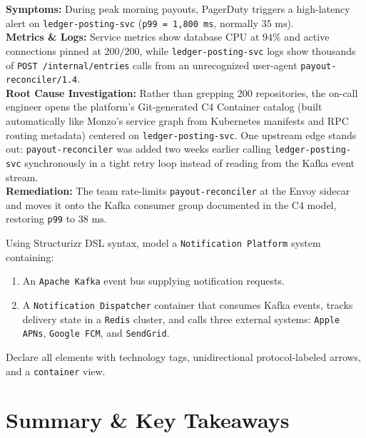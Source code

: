 \begin{realworldbox}
\textbf{Symptoms:} During peak morning payouts, PagerDuty triggers a high-latency alert on \texttt{ledger-posting-svc} (\texttt{p99 = 1,800 ms}, normally $35\text{ ms}$).\\
\textbf{Metrics \& Logs:} Service metrics show database CPU at $94\%$ and active connections pinned at $200/200$, while \texttt{ledger-posting-svc} logs show thousands of \texttt{POST /internal/entries} calls from an unrecognized user-agent \texttt{payout-reconciler/1.4}.\\
\textbf{Root Cause Investigation:} Rather than grepping 200 repositories, the on-call engineer opens the platform's Git-generated C4 Container catalog (built automatically like Monzo's service graph from Kubernetes manifests and RPC routing metadata) centered on \texttt{ledger-posting-svc}. One upstream edge stands out: \texttt{payout-reconciler} was added two weeks earlier calling \texttt{ledger-posting-svc} synchronously in a tight retry loop instead of reading from the Kafka event stream.\\
\textbf{Remediation:} The team rate-limits \texttt{payout-reconciler} at the Envoy sidecar and moves it onto the Kafka consumer group documented in the C4 model, restoring \texttt{p99} to $38\text{ ms}$.
\end{realworldbox}

\begin{tryityourselfbox}
Using Structurizr DSL syntax, model a \texttt{Notification Platform} system containing:
\begin{enumerate}
  \item An \texttt{Apache Kafka} event bus supplying notification requests.
  \item A \texttt{Notification Dispatcher} container that consumes Kafka events, tracks delivery state in a \texttt{Redis} cluster, and calls three external systems: \texttt{Apple APNs}, \texttt{Google FCM}, and \texttt{SendGrid}.
\end{enumerate}
Declare all elements with technology tags, unidirectional protocol-labeled arrows, and a \texttt{container} view.
\end{tryityourselfbox}

\section{Summary \protect\& Key Takeaways}

